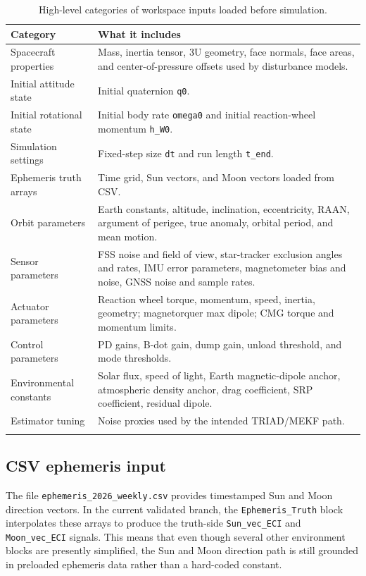 \documentclass[11pt]{article}
\begin{document}
\begin{longtable}{@{}p{}p{}@{}}
\toprule
\textbf{Category} & \textbf{What it includes} \\
\midrule
\endhead
Spacecraft properties & Mass, inertia tensor, 3U geometry, face normals, face areas, and center-of-pressure offsets used by disturbance models. \\
Initial attitude state & Initial quaternion \texttt{q0}. \\
Initial rotational state & Initial body rate \texttt{omega0} and initial reaction-wheel momentum \texttt{h\_W0}. \\
Simulation settings & Fixed-step size \texttt{dt} and run length \texttt{t\_end}. \\
Ephemeris truth arrays & Time grid, Sun vectors, and Moon vectors loaded from CSV. \\
Orbit parameters & Earth constants, altitude, inclination, eccentricity, RAAN, argument of perigee, true anomaly, orbital period, and mean motion. \\
Sensor parameters & FSS noise and field of view, star-tracker exclusion angles and rates, IMU error parameters, magnetometer bias and noise, GNSS noise and sample rates. \\
Actuator parameters & Reaction wheel torque, momentum, speed, inertia, geometry; magnetorquer max dipole; CMG torque and momentum limits. \\
Control parameters & PD gains, B-dot gain, dump gain, unload threshold, and mode thresholds. \\
Environmental constants & Solar flux, speed of light, Earth magnetic-dipole anchor, atmospheric density anchor, drag coefficient, SRP coefficient, residual dipole. \\
Estimator tuning & Noise proxies used by the intended TRIAD/MEKF path. \\
\bottomrule
\caption{High-level categories of workspace inputs loaded before simulation.}
\label{tab:input-categories}
\end{longtable}

\subsection{CSV ephemeris input}

The file \texttt{ephemeris\_2026\_weekly.csv} provides timestamped Sun and Moon direction vectors. In the current validated branch, the \texttt{Ephemeris\_Truth} block interpolates these arrays to produce the truth-side \texttt{Sun\_vec\_ECI} and \texttt{Moon\_vec\_ECI} signals. This means that even though several other environment blocks are presently simplified, the Sun and Moon direction path is still grounded in preloaded ephemeris data rather than a hard-coded constant.
\end{document}
